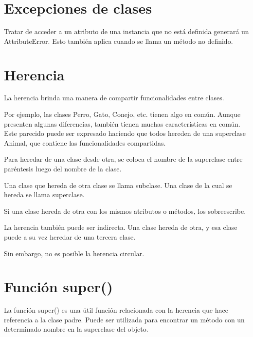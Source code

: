 \documentclass{report}
\begin{document}
{

\section{Excepciones de clases}

Tratar de acceder a un atributo de una instancia que no está definida generará un AttributeError. Esto también aplica cuando se llama un método no definido.


\section{Herencia}

La herencia brinda una manera de compartir funcionalidades entre clases.

Por ejemplo, las clases Perro, Gato, Conejo, etc. tienen algo en común. Aunque presenten algunas diferencias, también tienen muchas características en común. Este parecido puede ser expresado haciendo que todos hereden de una superclase Animal, que contiene las funcionalidades compartidas.

Para heredar de una clase desde otra, se coloca el nombre de la superclase entre paréntesis luego del nombre de la clase.


Una clase que hereda de otra clase se llama subclase. Una clase de la cual se hereda se llama superclase.

Si una clase hereda de otra con los mismos atributos o métodos, los sobreescribe.


La herencia también puede ser indirecta. Una clase hereda de otra, y esa clase puede a su vez heredar de una tercera clase.


Sin embargo, no es posible la herencia circular.

\section{Función super()}

La función super() es una útil función relacionada con la herencia que hace referencia a la clase padre. Puede ser utilizada para encontrar un método con un determinado nombre en la superclase del objeto.

}
\end{document}
